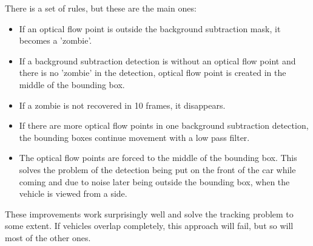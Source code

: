 \documentclass[a4paper,12pt,titlepage, twoside]{article}
\numberwithin{figure}{section}
\begin{document}
There is a set of rules, but these are the main ones:
\begin{itemize}
	\item If an optical flow point is outside the background subtraction mask, it becomes a 'zombie'.
	\item If a background subtraction detection is without an optical flow point and there is no 'zombie' in the detection, optical flow point is created in the middle of the bounding box. 
	\item If a zombie is not recovered in 10 frames, it disappears. 
	\item If there are more optical flow points in one background subtraction detection, the bounding boxes continue movement with a low pass filter.
	\item The optical flow points are forced to the middle of the bounding box. This solves the problem of the detection being put on the front of the car while coming and due to noise later being outside the bounding box, when the vehicle is viewed from a side. 
\end{itemize}

These improvements work surprisingly well and solve the tracking problem to some extent. If vehicles overlap completely, this approach will fail, but so will most of the other ones. 











{}
\cleardoublepage
\clearpage
\end{document}
